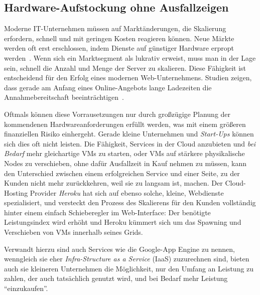 \subsection{Hardware-Aufstockung ohne Ausfallzeigen}
Moderne IT-Unternehmen müssen auf Marktänderungen, die Skalierung
erfordern, schnell und mit geringen Kosten reagieren können. Neue
Märkte werden oft erst erschlossen, indem Dienste auf günstiger
Hardware erpropt werden~\cite{tanenbaum1992modern}. Wenn sich ein
Marktsegment als lukrativ erweist, muss man in der Lage sein, schnell
die Anzahl und Menge der Server zu skalieren. Diese Fähigkeit ist
entscheidend für den Erfolg eines modernen Web-Unternehmens. Studien
zeigen, dass gerade am Anfang eines Online-Angebots lange Ladezeiten
die Annahmebereitschaft beeinträchtigen~\cite{kohavi2007online}.

Oftmals können diese Vorrausetzungen nur durch großzügige Planung der
kommendenen Hardwareanforderungen erfüllt werden, was mit einem
größeren finanziellen Risiko einhergeht. Gerade kleine Unternehmen und
\emph{Start-Ups} können sich dies oft nicht leisten. Die Fähigkeit,
Services in der Cloud anzubieten und \emph{bei Bedarf} mehr
gleichartige VMs zu starten, oder VMs auf stärkere physikalische Nodes
zu verschieben, ohne dafür Ausfallzeit in Kauf nehmen zu müssen, kann
den Unterschied zwischen einem erfolgreichen Service und einer Seite,
zu der Kunden nicht mehr zurückkehren, weil sie zu langsam ist,
machen. Der Cloud-Hosting Provider \emph{Heroku} hat sich auf ebenso
solche, kleine, Webdienste spezialisiert, und versteckt den Prozess
des Skalierens für den Kunden vollständig hinter einem einfach
Schieberegler im Web-Interface: Der benötigte Leistungsindex wird
erhöht und Heroku kümmert sich um das Spawning und Verschieben von
VMs innerhalb seines Grids.

Verwandt hierzu sind auch Services wie die Google-App Engine zu
nennen, wenngleich sie eher \emph{Infra-Structure as a Service} (IaaS)
zuzurechnen sind, bieten auch sie kleineren Unternehmen die
Möglichkeit, nur den Umfang an Leistung zu zahlen, der auch
tatsächlich genutzt wird, und bei Bedarf mehr Leistung
"`einzukaufen"'.

